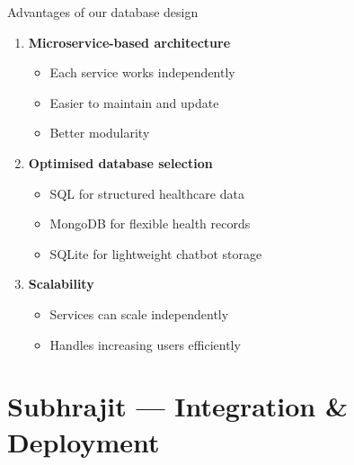 \documentclass[aspectratio=169,11pt]{beamer}
\begin{document}
\begin{frame}{Advantages of our database design}
  \begin{enumerate}
    \item \textbf{Microservice-based architecture}
    \begin{itemize}\small
      \item Each service works independently
      \item Easier to maintain and update
      \item Better modularity
    \end{itemize}
    \item \textbf{Optimised database selection}
    \begin{itemize}\small
      \item SQL for structured healthcare data
      \item MongoDB for flexible health records
      \item SQLite for lightweight chatbot storage
    \end{itemize}
    \item \textbf{Scalability}
    \begin{itemize}\small
      \item Services can scale independently
      \item Handles increasing users efficiently
    \end{itemize}
  \end{enumerate}
\end{frame}

\section{Subhrajit --- Integration \& Deployment}
\end{document}
